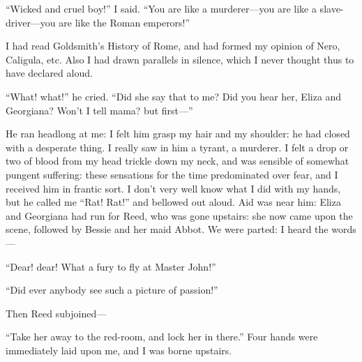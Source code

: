 \enquote{Wicked and cruel boy!} I said. \enquote{You are like a
	murderer---you are like a slave-driver---you are like the Roman
	emperors!}

I had read Goldsmith's History of Rome, and had formed my opinion of
Nero, Caligula, etc. Also I had drawn parallels in silence, which I
never thought thus to have declared aloud.

\enquote{What! what!} he cried. \enquote{Did she say that to me? Did
	you hear her, Eliza and Georgiana? Won't I tell mama? but first---}

He ran headlong at me: I felt him grasp my hair and my shoulder: he had
closed with a desperate thing. I really saw in him a tyrant, a
murderer. I felt a drop or two of blood from my head trickle down my
neck, and was sensible of somewhat pungent suffering: these sensations
for the time predominated over fear, and I received him in frantic
sort. I don't very well know what I did with my hands, but he called me
\enquote{Rat! Rat!} and bellowed out aloud. Aid was near him: Eliza
and Georgiana had run for \Mrs{} Reed, who was gone upstairs: she now came
upon the scene, followed by Bessie and her maid Abbot. We were parted:
I heard the words---

\enquote{Dear! dear! What a fury to fly at Master John!}

\enquote{Did ever anybody see such a picture of passion!}

Then \Mrs{} Reed subjoined---

\enquote{Take her away to the red-room, and lock her in there.} Four
hands were immediately laid upon me, and I was borne upstairs.
